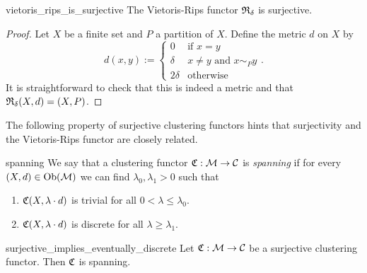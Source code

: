 \begin{proposition}{\cite[Rem.~6.1]{Carlsson2010}}{vietoris_rips_is_surjective}
    The Vietoris-Rips functor $\mathfrak{R}_\delta$ is surjective.
\end{proposition}
\begin{proof}
Let $X$ be a finite set and $P$ a partition of $X$. Define the metric $d$ on $X$ by
\begin{equation*}
    d(x,y) := \begin{cases}
        0 & \text{if } x = y\\
        \delta & x \neq y \text{ and } x \sim_P y\\
        2\delta & \text{otherwise}
    \end{cases}.
\end{equation*}
It is straightforward to check that this is indeed a metric and that $\mathfrak{R}_\delta(X,d) = (X,P)$.
\end{proof}

The following property of surjective clustering functors hints that surjectivity and the Vietoris-Rips functor are closely related.


\begin{definition}{}{spanning}
    We say that a clustering functor $\mathfrak{C}: \mathcal{M} \to \mathcal{C}$ is \emph{spanning} if for every $(X,d) \in \mathrm {Ob}(\mathcal{M})$ we can find $\lambda_0, \lambda_1 > 0$ such that
    \begin{enumerate}
        \item $\mathfrak{C}(X,\lambda \cdot d)$ is trivial for all $0 < \lambda \le \lambda_0$.
        \item $\mathfrak{C}(X,\lambda \cdot d)$ is discrete for all $\lambda \ge \lambda_1$.
    \end{enumerate}
\end{definition}

\begin{lemma}{}{surjective_implies_eventually_discrete}
    Let $\mathfrak{C}: \mathcal{M} \to \mathcal{C}$ be a surjective clustering functor. Then $\mathfrak{C}$ is spanning.
\end{lemma}

